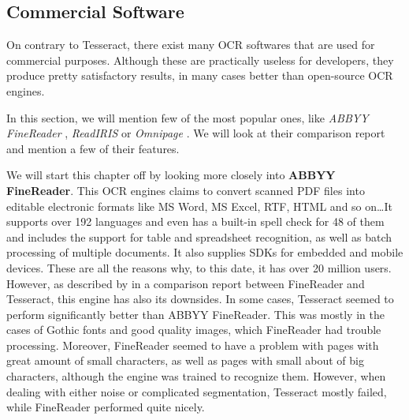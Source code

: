 \subsection{Commercial Software}


On contrary to Tesseract, there exist many OCR softwares that are used for commercial purposes. Although these are practically useless for developers, they produce pretty satisfactory results, in many cases better than open-source OCR engines.

In this section, we will mention few of the most popular ones, like \emph{ABBYY FineReader} \citep{Finereader}, \emph{ReadIRIS} \citep{ReadIris} or \emph{Omnipage} \citep{Omnipage}. We will look at their comparison report and mention a few of their features.

We will start this chapter off by looking more closely into \textbf{ABBYY FineReader}. This OCR engines claims to convert scanned PDF files into editable electronic formats like MS Word, MS Excel, RTF, HTML and so on\ldots It supports over 192 languages and even has a built-in spell check for 48 of them and includes the support for table and spreadsheet recognition, as well as batch processing of multiple documents. It also supplies SDKs for embedded and mobile devices. These are all the reasons why, to this date, it has over 20 million users. However, as described by \citet{comparisonTessABBYY} in a comparison report between FineReader and Tesseract, this engine has also its downsides. In some cases, Tesseract seemed to perform significantly better than ABBYY FineReader. This was mostly in the cases of Gothic fonts and good quality images, which FineReader had trouble processing. Moreover, FineReader seemed to have a problem with pages with great amount of small characters, as well as pages with small about of big characters, although the engine was trained to recognize them. However, when dealing with either noise or complicated segmentation, Tesseract mostly failed, while FineReader performed quite nicely.

